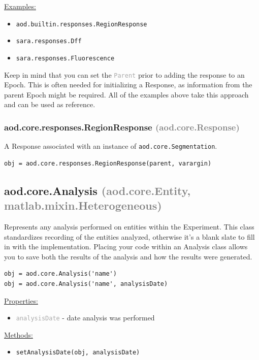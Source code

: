 \documentclass[10pt]{exam}
\newcommand\myparent[1]{\textcolor{gray}{(#1)}}
\newcommand\aodclass[1]{\textcolor{codeblue}{\texttt{#1}}}
\newcommand\aodprop[1]{\textcolor{darkgray}{\texttt{#1}}}
\newcommand\aodfcn[1]{\textcolor{darkteal}{\texttt{#1}}}
\newcommand\docheader[1]{\vspace{0.6ex}\noindent\underline{#1}\vspace{0.15ex}}
\begin{document}
		\docheader{Examples:}
		\begin{itemize}
			\item \aodclass{aod.builtin.responses.RegionResponse}
			\item \aodclass{sara.responses.Dff}
			\item \aodclass{sara.responses.Fluorescence}
		\end{itemize}
		\noindent Keep in mind that you can set the \aodprop{Parent} prior to adding the response to an Epoch. This is often needed for initializing a Response, as information from the parent Epoch might be required. All of the examples above take this approach and can be used as reference.
		
		\subsubsection{aod.core.responses.RegionResponse \myparent{aod.core.Response}}
			\noindent A Response associated with an instance of \aodclass{aod.core.Segmentation}.
			\begin{lstlisting}[style=matlab-editor, basicstyle=\mlttfamily\footnotesize]
obj = aod.core.responses.RegionResponse(parent, varargin)
			\end{lstlisting}
	
	\subsection{aod.core.Analysis \myparent{aod.core.Entity, matlab.mixin.Heterogeneous}} 
		\noindent Represents any analysis performed on entities within the Experiment. This class standardizes recording of the entities analyzed, otherwise it's a blank slate to fill in with the implementation. Placing your code within an Analysis class allows you to save both the results of the analysis and how the results were generated.
		\begin{lstlisting}[style=matlab-editor, basicstyle=\mlttfamily\footnotesize]
obj = aod.core.Analysis('name')
obj = aod.core.Analysis('name', analysisDate)
		\end{lstlisting}
		\docheader{Properties:}
		\begin{itemize}
			\item \aodprop{analysisDate} - date analysis was performed
		\end{itemize}
		\docheader{Methods:}
		\begin{itemize}
			\item \aodfcn{setAnalysisDate(obj, analysisDate)}
		\end{itemize}			
\end{document}
